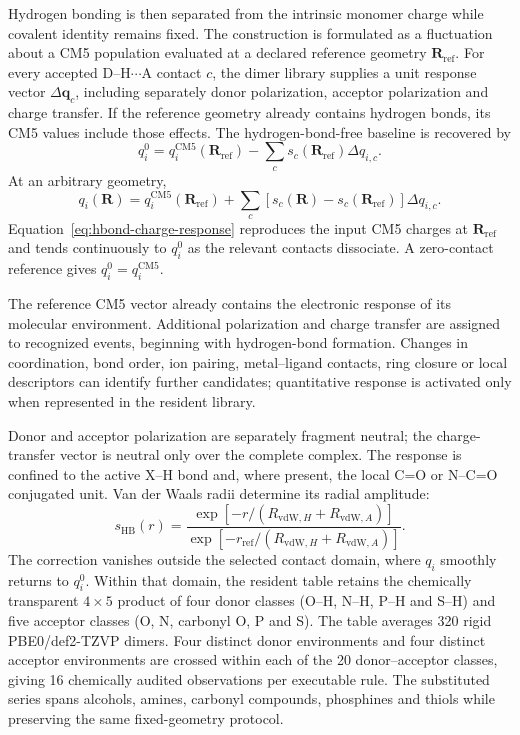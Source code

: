 \documentclass[journal=jctcce,manuscript=article]{achemso}
\begin{document}
Hydrogen bonding is then separated from the intrinsic monomer charge while
covalent identity remains fixed.  The construction is formulated as a fluctuation
about a CM5 population evaluated at a declared reference geometry
$\mathbf R_{\mathrm{ref}}$.  For every accepted
D--H$\cdots$A contact $c$, the dimer library supplies a unit response vector
$\Delta\mathbf q_c$, including separately donor polarization, acceptor
polarization and charge transfer.  If the reference geometry already contains
hydrogen bonds, its CM5 values include those effects.  The hydrogen-bond-free
baseline is recovered by
\begin{equation}
q_i^0=q_i^{\mathrm{CM5}}(\mathbf R_{\mathrm{ref}})
-\sum_c s_c(\mathbf R_{\mathrm{ref}})\Delta q_{i,c}.
\label{eq:hbond-intrinsic-reference}
\end{equation}
At an arbitrary geometry,
\begin{equation}
q_i(\mathbf R)=q_i^{\mathrm{CM5}}(\mathbf R_{\mathrm{ref}})
+\sum_c\left[s_c(\mathbf R)-s_c(\mathbf R_{\mathrm{ref}})\right]
\Delta q_{i,c}.
\label{eq:hbond-charge-response}
\end{equation}
Equation~\ref{eq:hbond-charge-response} reproduces the input CM5 charges at
$\mathbf R_{\mathrm{ref}}$ and tends continuously to $q_i^0$ as the relevant
contacts dissociate.  A zero-contact reference gives
$q_i^0=q_i^{\mathrm{CM5}}$.

The reference CM5 vector already contains the electronic response of its
molecular environment.  Additional polarization and charge transfer are
assigned to recognized events, beginning with hydrogen-bond formation.
Changes in coordination, bond order, ion pairing, metal--ligand contacts,
ring closure or local descriptors can identify further candidates; quantitative
response is activated only when represented in the resident library.

Donor and acceptor polarization are separately fragment neutral; the
charge-transfer vector is neutral only over the complete complex.  The
response is confined to the active X--H bond and, where present, the local
C=O or N--C=O conjugated unit.  Van der Waals radii determine its radial
amplitude:
\begin{equation}
s_{\mathrm{HB}}(r)=
\frac{\exp[-r/(R_{\mathrm{vdW},H}+R_{\mathrm{vdW},A})]}
{\exp[-r_{\mathrm{ref}}/(R_{\mathrm{vdW},H}+R_{\mathrm{vdW},A})]}.
\label{eq:hbond-charge-switch}
\end{equation}
The correction vanishes outside the selected contact domain, where
$q_i$ smoothly returns to $q_i^0$.  Within that domain, the resident table
retains the chemically transparent $4\times5$ product of four donor classes
(O--H, N--H, P--H and S--H) and five acceptor classes (O, N, carbonyl O, P and
S).  The table averages 320 rigid PBE0/def2-TZVP dimers.  Four distinct donor
environments and four distinct acceptor environments are crossed within each
of the 20 donor--acceptor classes, giving 16 chemically audited observations
per executable rule.  The substituted series spans alcohols, amines,
carbonyl compounds, phosphines and thiols while preserving the same
fixed-geometry protocol.
\end{document}
